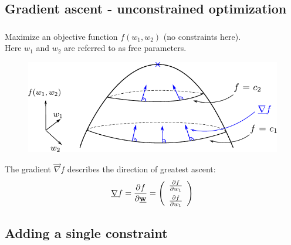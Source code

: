 \subsection{Gradient ascent - unconstrained optimization}
\begin{frame}\frametitle{\subsecname}
Maximize an objective function $f(w_1, w_2)$ (no constraints here).\\
Here $w_1$ and $w_2$ are referred to as free parameters.\\

\begin{figure}[h]
	\centering
	\includegraphics[width=0.8\linewidth]{img/lagrange_objfunction}%
    \label{fig:unconstrained}%
\end{figure}


\slidesonly{
\vspace{-3mm}
}

The gradient $\vec \nabla f$ describes the direction of greatest ascent:\\
\slidesonly{
\vspace{-3mm}
}
\begin{equation}
\underline{\mathbf{\nabla}} f = 
\frac{\partial f}{\partial \underline{\mathbf{w}}} = 
\left( \begin{array}{rrrrrrrrrrrrrrrrrrrrrrrrrr} \frac{\partial f}{\partial w_1} \\[0.2cm] \frac{\partial f}{\partial w_1} \\ \end{array} \right)
\end{equation}

\end{frame}

\subsection{Adding a single constraint}

